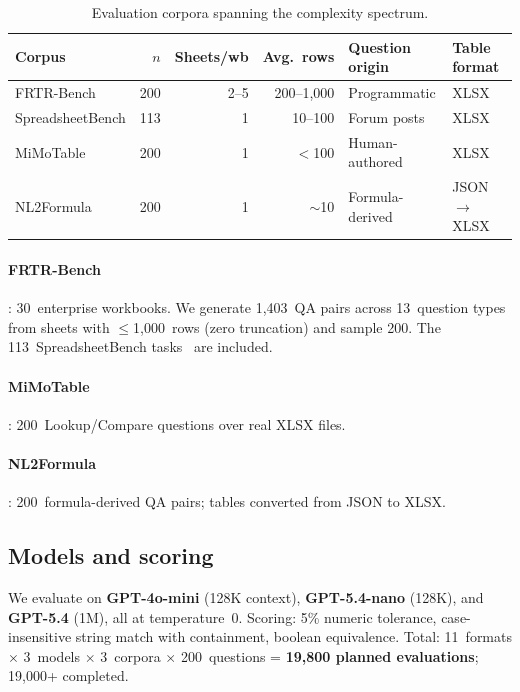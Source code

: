 \documentclass[11pt]{article}
\begin{document}
\begin{table}[t]
\centering
\caption{Evaluation corpora spanning the complexity spectrum.}
\label{tab:corpora}
\small
\begin{tabular}{lrrrll}
\toprule
\textbf{Corpus} & $n$ & \textbf{Sheets/wb} & \textbf{Avg.\ rows} & \textbf{Question origin} & \textbf{Table format} \\
\midrule
FRTR-Bench          & 200 & 2--5  & 200--1,000 & Programmatic    & XLSX \\
SpreadsheetBench    & 113 & 1     & 10--100    & Forum posts     & XLSX \\
MiMoTable           & 200 & 1     & $<$100     & Human-authored  & XLSX \\
NL2Formula          & 200 & 1     & $\sim$10   & Formula-derived & JSON$\to$XLSX \\
\bottomrule
\end{tabular}
\end{table}

\paragraph{FRTR-Bench} \citep{gulati2025frtr}: 30~enterprise workbooks. We generate 1,403~QA pairs across 13~question types from sheets with $\leq$1,000~rows (zero truncation) and sample 200. The 113~SpreadsheetBench tasks~\citep{ma2024spreadsheetbench} are included.

\paragraph{MiMoTable} \citep{li2024mimotable}: 200~Lookup/Compare questions over real XLSX files.

\paragraph{NL2Formula} \citep{zhao2024nl2formula}: 200~formula-derived QA pairs; tables converted from JSON to XLSX.

\subsection{Models and scoring}

We evaluate on \textbf{GPT-4o-mini} (128K context), \textbf{GPT-5.4-nano} (128K), and \textbf{GPT-5.4} (1M), all at temperature~0.
Scoring: 5\% numeric tolerance, case-insensitive string match with containment, boolean equivalence.
Total: 11~formats $\times$ 3~models $\times$ 3~corpora $\times$ 200~questions = \textbf{19,800 planned evaluations}; 19,000+ completed.
\end{document}
